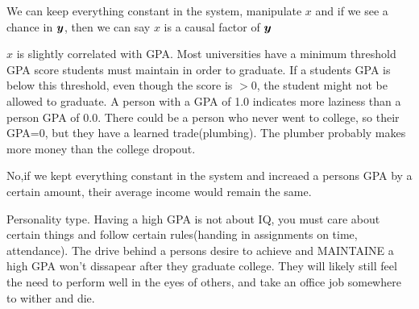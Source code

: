 \documentclass[12pt]{article}
\begin{document}
\begin{enumerate}

We can keep everything constant in the system, manipulate $x$ and if we see a chance in $\boldsymbol{y}$, then we can say $x$ is a causal factor of $\boldsymbol{y}$


$x$ is slightly correlated with GPA. Most universities have a minimum threshold GPA score students must maintain in order to graduate. If a students GPA is below this threshold, even though the score is $>0$, the student might not be allowed to graduate. A person with a GPA of 1.0 indicates more laziness than a person GPA of 0.0. There could be a person who never went to college, so their GPA=0, but they have a learned trade(plumbing). The plumber probably makes more money than the college dropout.  



No,if we kept everything constant in the system and increaed a persons GPA by a certain amount, their average income would remain the same.


Personality type. Having a high GPA is not about IQ, you must care about certain things and follow certain rules(handing in assignments on time, attendance). The drive behind a persons desire to achieve and MAINTAINE a high GPA won't dissapear after they graduate college. They will likely still feel the need to perform well in the eyes of others, and take an office job somewhere to wither and die.





\end{enumerate}
\end{document}
